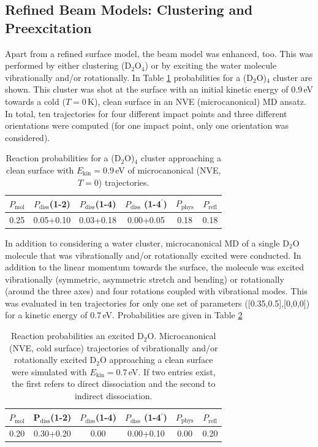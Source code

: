\documentclass[11pt,DIV=13,BCOR=5mm,a4paper,headinclude]{scrbook}
\begin{document}
%
\subsection{Refined Beam Models: Clustering and Preexcitation}
Apart from a refined surface model, the beam model was enhanced, too.
This was performed by either clustering (D$_2$O$_4$) or by exciting the water molecule vibrationally and/or rotationally.
In Table \ref{tab:4D2O-cluster} probabilities for a (D$_2$O)$_4$ cluster are shown.
This cluster was shot at the surface with an initial kinetic energy of $0.9\,$eV towards a cold ($T=0\,$K), clean surface in an NVE (microcanonical) MD ansatz.
In total, ten trajectories for four different impact points and three different orientations were computed (for one impact point, only one orientation was considered).

\begin{table}[hbt]
 \centering
  \caption{Reaction probabilities for a (D$_2$O)$_4$ cluster approaching a clean surface with $E_\textrm{kin}=0.9\,$eV of microcanonical (NVE, $T=0$) trajectories.}
 \begin{tabular}{cccccc}
\toprule
$P_\textrm{mol}$ & $P_\textrm{diss}$(1-2) &  $P_\textrm{diss}$(1-4) & $P_\textrm{diss}$ (1-4$^\prime$) & $P_\textrm{phys}$ & $P_\textrm{refl}$ \\\hline
0.25&0.05+0.10 &0.03+0.18 &0.00+0.05 &0.18 &0.18\\
\hline
\end{tabular}
 \label{tab:4D2O-cluster}
\end{table}

In addition to considering a water cluster, microcanonical MD of a single D$_2$O molecule that was vibrationally and/or rotationally excited were conducted.
In addition to the linear momentum towards the surface, the molecule was excited vibrationally (symmetric, asymmetric stretch and bending) or rotationally (around the three axes) and four rotations coupled with vibrational modes.
This was evaluated in ten trajectories for only one set of parameters ([0.35,0.5],[0,0,0]) for a kinetic energy of $0.7\,$eV.
Probabilities are given in Table \ref{tab:vib-rot_exc}
\begin{table}[!h]
 \centering
  \caption{Reaction probabilities an excited D$_2$O.
Microcanonical (NVE, cold surface) trajectories of vibrationally and/or rotationally excited D$_2$O approaching a clean surface were simulated with $E_\textrm{kin}=0.7\,$eV.
If two entries exist, the first refers to direct dissociation and the second to indirect dissociation.}
 \begin{tabular}{cccccc}
\toprule
$P_\textrm{mol}$ & P$_\textrm{diss}$(1-2) &  $P_\textrm{diss}$(1-4) & $P_\textrm{diss}$ (1-4$^\prime$) & $P_\textrm{phys}$ & $P_\textrm{refl}$ \\\midrule
0.20&0.30+0.20 & 0.00 &0.00+0.10 &0.00 &0.20\\
\bottomrule
\end{tabular}
 \label{tab:vib-rot_exc}
\end{table}
\end{document}

